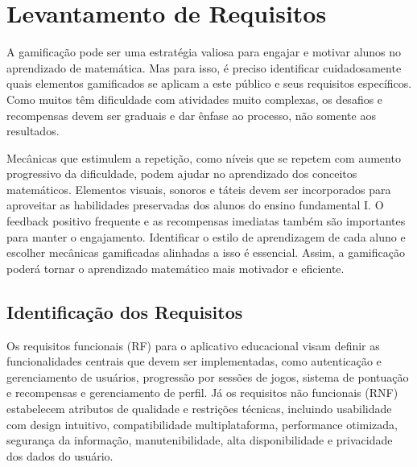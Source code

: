 \section{Levantamento de Requisitos}

A gamificação pode ser uma estratégia valiosa para engajar e motivar alunos no aprendizado de matemática. Mas para isso, é preciso identificar cuidadosamente quais elementos gamificados se aplicam a este público e seus requisitos específicos. Como muitos têm dificuldade com atividades muito complexas, os desafios e recompensas devem ser graduais e dar ênfase ao processo, não somente aos resultados.

Mecânicas que estimulem a repetição, como níveis que se repetem com aumento progressivo da dificuldade, podem ajudar no aprendizado dos conceitos matemáticos. Elementos visuais, sonoros e táteis devem ser incorporados para aproveitar as habilidades preservadas dos alunos do ensino fundamental I. O feedback positivo frequente e as recompensas imediatas também são importantes para manter o engajamento. Identificar o estilo de aprendizagem de cada aluno e escolher mecânicas gamificadas alinhadas a isso é essencial. Assim, a gamificação poderá tornar o aprendizado matemático mais motivador e eficiente.


\subsection{Identificação dos Requisitos}


Os requisitos funcionais (RF) para o aplicativo educacional visam definir as funcionalidades centrais que devem ser implementadas, como autenticação e gerenciamento de usuários, progressão por sessões de jogos, sistema de pontuação e recompensas e gerenciamento de perfil. 
Já os requisitos não funcionais (RNF) estabelecem atributos de qualidade e restrições técnicas, incluindo usabilidade com design intuitivo, compatibilidade multiplataforma, performance otimizada, segurança da informação, manutenibilidade, alta disponibilidade e privacidade dos dados do usuário.

